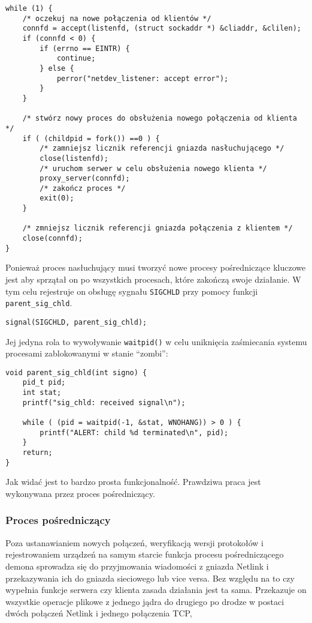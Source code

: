 \documentclass[10pt]{article}
\begin{document}
\begin{verbatim}
while (1) {
    /* oczekuj na nowe połączenia od klientów */
    connfd = accept(listenfd, (struct sockaddr *) &cliaddr, &clilen);
    if (connfd < 0) {
        if (errno == EINTR) {
            continue;
        } else {
            perror("netdev_listener: accept error");
        }
    }

    /* stwórz nowy proces do obsłużenia nowego połączenia od klienta */
    if ( (childpid = fork()) ==0 ) {
        /* zamniejsz licznik referencji gniazda nasłuchującego */
        close(listenfd);
        /* uruchom serwer w celu obsłużenia nowego klienta */
        proxy_server(connfd);
        /* zakończ proces */
        exit(0);
    }

    /* zmniejsz licznik referencji gniazda połączenia z klientem */
    close(connfd);
}
\end{verbatim}

Ponieważ proces nasłuchujący musi tworzyć nowe procesy pośredniczące kluczowe jest aby sprzątał on po wszystkich procesach, które zakończą swoje działanie. W tym celu rejestruje on obsługę sygnału \texttt{SIGCHLD} przy pomocy funkcji \texttt{parent\_sig\_chld}.

\begin{verbatim}
signal(SIGCHLD, parent_sig_chld);
\end{verbatim}

Jej jedyna rola to wywoływanie \texttt{waitpid()} w celu uniknięcia zaśmiecania systemu procesami zablokowanymi w stanie ``zombi'':

\begin{verbatim}
void parent_sig_chld(int signo) {
    pid_t pid;
    int stat;
    printf("sig_chld: received signal\n");

    while ( (pid = waitpid(-1, &stat, WNOHANG)) > 0 ) {
        printf("ALERT: child %d terminated\n", pid);
    }
    return;
}
\end{verbatim}

Jak widać jest to bardzo prosta funkcjonalność. Prawdziwa praca jest wykonywana przez proces pośredniczący.

\subsubsection{Proces pośredniczący}

Poza ustanawianiem nowych połączeń, weryfikacją wersji protokołów i rejestrowaniem urządzeń na samym starcie funkcja procesu pośredniczącego demona sprowadza się do przyjmowania wiadomości z gniazda Netlink i przekazywania ich do gniazda sieciowego lub vice versa. Bez względu na to czy wypełnia funkcje serwera czy klienta zasada działania jest ta sama. Przekazuje on wszystkie operacje plikowe z jednego jądra do drugiego po drodze w postaci dwóch połączeń Netlink i jednego połączenia TCP,
\end{document}

